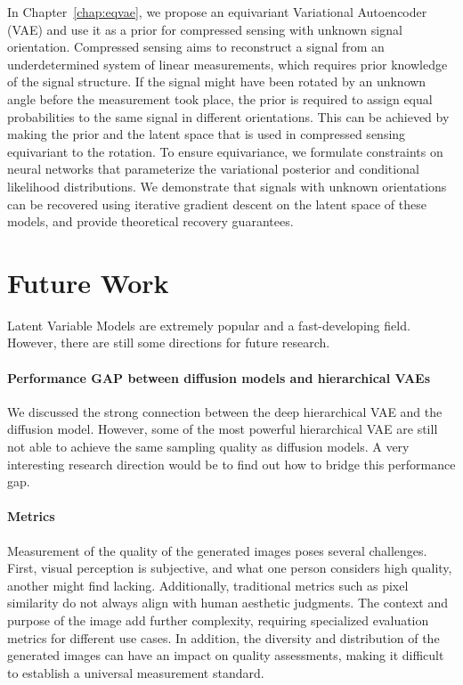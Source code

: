 In Chapter~\ref{chap:eqvae}, we propose an equivariant Variational Autoencoder (VAE) and use it as a prior for compressed sensing with unknown signal orientation. 
Compressed sensing aims to reconstruct a signal from an underdetermined system of linear measurements, which requires prior knowledge of the signal structure. 
If the signal might have been rotated by an unknown angle before the measurement took place, the prior is required to assign equal probabilities to the same signal in different orientations. 
This can be achieved by making the prior and the latent space that is used in compressed sensing equivariant to the rotation. 
To ensure equivariance, we formulate constraints on neural networks that parameterize the variational posterior and conditional likelihood distributions. 
We demonstrate that signals with unknown orientations can be recovered using iterative gradient descent on the latent space of these models, and provide theoretical recovery guarantees.


\section{Future Work}
Latent Variable Models are extremely popular and a fast-developing field. However, there are still some directions for future research.
\paragraph{Performance GAP between diffusion models and hierarchical VAEs}
We discussed the strong connection between the deep hierarchical VAE and the diffusion model. However, some of the most powerful hierarchical VAE are still not able to achieve the same sampling quality as diffusion models. A very interesting research direction would be to find out how to bridge this performance gap. 

\paragraph{Metrics}
Measurement of the quality of the generated images poses several challenges. First, visual perception is subjective, and what one person considers high quality, another might find lacking. 
Additionally, traditional metrics such as pixel similarity do not always align with human aesthetic judgments. The context and purpose of the image add further complexity, requiring specialized evaluation metrics for different use cases. In addition, the diversity and distribution of the generated images can have an impact on quality assessments, making it difficult to establish a universal measurement standard. 

